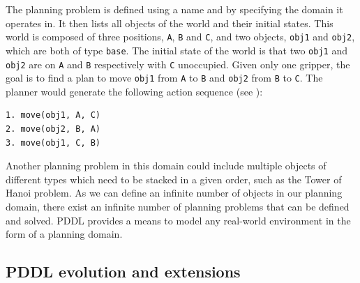 The planning problem is defined using a name and by specifying the domain it operates in.
It then lists all objects of the world and their initial states. 
This world is composed of three positions, \texttt{A}, \texttt{B} and \texttt{C}, and two objects, \texttt{obj1} and \texttt{obj2}, which are both of type \texttt{base}. 
The initial state of the world is that two \texttt{obj1} and \texttt{obj2} are on \texttt{A} and \texttt{B} respectively with \texttt{C} unoccupied.
Given only one gripper, the goal is to find a plan to move \texttt{obj1} from \texttt{A} to \texttt{B} and \texttt{obj2} from \texttt{B} to \texttt{C}. 
The planner would generate the following action sequence (see ):
\begin{verbatim}
1. move(obj1, A, C)
2. move(obj2, B, A)
3. move(obj1, C, B)
\end{verbatim}

Another planning problem in this domain could include multiple objects of different types which need to be stacked in a given order, such as the Tower of Hanoi problem.
As we can define an infinite number of objects in our planning domain, there exist an infinite number of planning problems that can be defined and solved. 
PDDL provides a means to model any real-world environment in the form of a planning domain. 

\subsection{PDDL evolution and extensions}\label{subsec:PDDL evolution}

